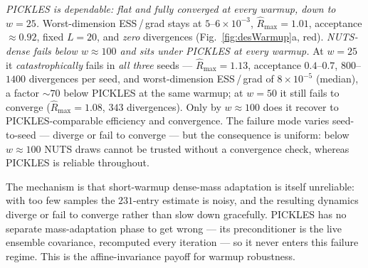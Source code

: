 \documentclass{article}
\begin{document}
\emph{PICKLES is dependable: flat and fully converged at every warmup,
down to $w=25$.} Worst-dimension ESS\,/\,grad stays at
$5$--$6\times10^{-3}$, $\hat R_{\max}=1.01$, acceptance $\approx\!0.92$,
fixed $L=20$, and \emph{zero} divergences (Fig.~\ref{fig:desWarmup}a, red).
\emph{NUTS-dense fails below $w\!\approx\!100$ and sits under PICKLES at
every warmup.} At $w=25$ it \emph{catastrophically} fails in \emph{all
three} seeds --- $\hat R_{\max}=1.13$, acceptance $0.4$--$0.7$,
$800$--$1400$ divergences per seed, and worst-dimension ESS\,/\,grad of
$8\times10^{-5}$ (median), a factor $\sim\!70$ below PICKLES at the same
warmup; at $w=50$ it still fails to converge ($\hat R_{\max}=1.08$, $343$
divergences). Only by $w\!\approx\!100$ does it recover to
PICKLES-comparable efficiency and convergence. The failure mode varies
seed-to-seed --- diverge or fail to converge --- but the consequence is
uniform: below $w\!\approx\!100$ NUTS draws cannot be trusted without a
convergence check, whereas PICKLES is reliable throughout.

The mechanism is that short-warmup dense-mass adaptation is itself
unreliable: with too few samples the $231$-entry estimate is noisy, and
the resulting dynamics diverge or fail to converge rather than slow down
gracefully. PICKLES has no separate mass-adaptation phase to get wrong
--- its preconditioner is the live ensemble covariance, recomputed every
iteration --- so it never enters this failure regime. This is the
affine-invariance payoff for warmup robustness.
\end{document}
